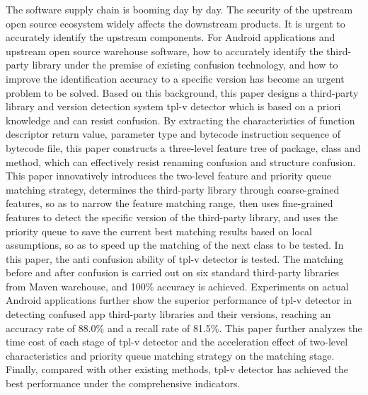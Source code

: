 \begin{abstract*}
The software supply chain is booming day by day. The security of the upstream open source ecosystem widely affects the downstream products. It is urgent to accurately identify the upstream components. For Android applications and upstream open source warehouse software, how to accurately identify the third-party library under the premise of existing confusion technology, and how to improve the identification accuracy to a specific version has become an urgent problem to be solved. Based on this background, this paper designs a third-party library and version detection system tpl-v detector which is based on a priori knowledge and can resist confusion. By extracting the characteristics of function descriptor return value, parameter type and bytecode instruction sequence of bytecode file, this paper constructs a three-level feature tree of package, class and method, which can effectively resist renaming confusion and structure confusion. This paper innovatively introduces the two-level feature and priority queue matching strategy, determines the third-party library through coarse-grained features, so as to narrow the feature matching range, then uses fine-grained features to detect the specific version of the third-party library, and uses the priority queue to save the current best matching results based on local assumptions, so as to speed up the matching of the next class to be tested. In this paper, the anti confusion ability of tpl-v detector is tested. The matching before and after confusion is carried out on six standard third-party libraries from Maven warehouse, and 100\% accuracy is achieved. Experiments on actual Android applications further show the superior performance of tpl-v detector in detecting confused app third-party libraries and their versions, reaching an accuracy rate of 88.0\% and a recall rate of 81.5\%. This paper further analyzes the time cost of each stage of tpl-v detector and the acceleration effect of two-level characteristics and priority queue matching strategy on the matching stage. Finally, compared with other existing methods, tpl-v detector has achieved the best performance under the comprehensive indicators.
\end{abstract*}
